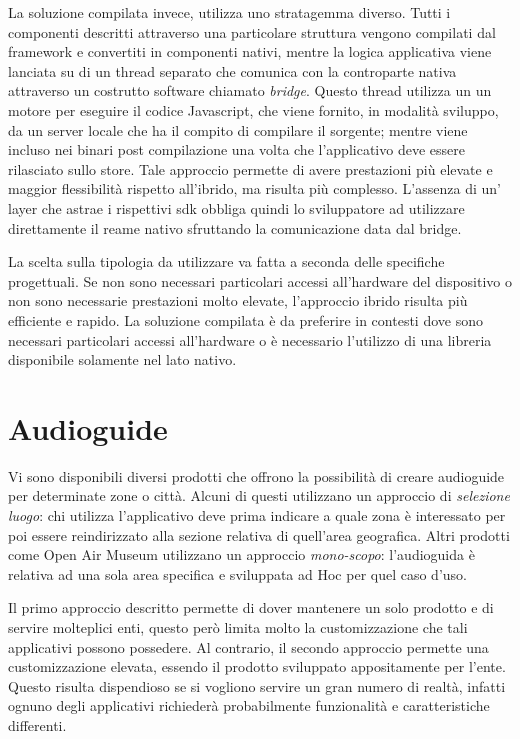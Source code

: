 La soluzione compilata invece, utilizza uno stratagemma diverso. Tutti i componenti descritti attraverso una particolare struttura vengono compilati dal framework e convertiti in componenti nativi, mentre la logica applicativa viene lanciata su di un thread separato che comunica con la controparte nativa attraverso un costrutto software chiamato \emph{bridge}. Questo thread utilizza un un motore per eseguire il codice Javascript, che viene fornito, in modalità sviluppo, da un server locale che ha il compito di compilare il sorgente; mentre viene incluso nei binari post compilazione una volta che l'applicativo deve essere rilasciato sullo store. Tale approccio permette di avere prestazioni più elevate e maggior flessibilità rispetto all'ibrido, ma risulta più complesso. L'assenza di un' layer che astrae i rispettivi sdk obbliga quindi lo sviluppatore ad utilizzare direttamente il reame nativo sfruttando la comunicazione data dal bridge.\vspace{5mm}

La scelta sulla tipologia da utilizzare va fatta a seconda delle specifiche progettuali. Se non sono necessari particolari accessi all'hardware del dispositivo o non sono necessarie prestazioni molto elevate, l'approccio ibrido risulta più efficiente e rapido. La soluzione compilata è da preferire in contesti dove sono necessari particolari accessi all'hardware o è necessario l'utilizzo di una libreria disponibile solamente nel lato nativo.


\section{Audioguide}\vspace{5mm}

Vi sono disponibili diversi prodotti che offrono la possibilità di creare audioguide per determinate zone o città. Alcuni di questi utilizzano un approccio di \emph{selezione luogo}: chi utilizza l’applicativo deve prima indicare a quale zona è interessato per poi essere reindirizzato alla sezione relativa di quell’area geografica. Altri prodotti come Open Air Museum utilizzano un approccio \emph{mono-scopo}: l’audioguida è relativa ad una sola area specifica e sviluppata ad Hoc per quel caso d'uso. \vspace{5mm}

Il primo approccio descritto permette di dover mantenere un solo prodotto e di servire molteplici enti, questo però limita molto la customizzazione che tali applicativi possono possedere. Al contrario, il secondo approccio permette una customizzazione elevata, essendo il prodotto sviluppato appositamente per l’ente. Questo risulta dispendioso se si vogliono servire un gran numero di realtà, infatti ognuno degli applicativi richiederà probabilmente funzionalità e caratteristiche differenti.\vspace{5mm}

